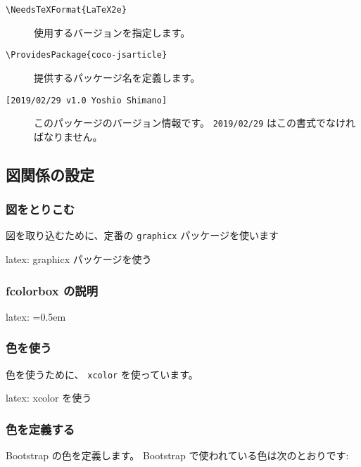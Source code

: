 \documentclass[dvipdfmx,a4j,14pt,uplatex]{jsarticle}
\begin{document}
\begin{description}
\item[{\texttt{\textbackslash{}NeedsTeXFormat\{LaTeX2e\}}}] 使用するバージョンを指定します。
\item[{\texttt{\textbackslash{}ProvidesPackage\{coco-jsarticle\}}}] 提供するパッケージ名を定義します。
\item[{\texttt{[2019/02/29 v1.0 Yoshio Shimano]}}] このパッケージのバージョン情報です。
\texttt{2019/02/29} はこの書式でなければなりません。
\end{description}

\subsection{図関係の設定}
\label{sec:orga93c5e8}
\subsubsection{図をとりこむ}
\label{sec:org1dd340b}
図を取り込むために、定番の \texttt{graphicx} パッケージを使います

\begin{programlist}[label={org2dc6ae6}]{latex}{: graphicx パッケージを使う}\usepackage{graphicx}
\end{programlist}

\subsubsection{fcolorbox の説明}
\label{sec:org692ddfc}
\begin{programlist}[label={nil}]{latex}{: }\fboxsep=0.5em
\fboxrule=0pt
\end{programlist}

\subsubsection{色を使う}
\label{sec:orgf027b93}
色を使うために、 \texttt{xcolor} を使っています。

\begin{programlist}[label={org9310bf0}]{latex}{: xcolor を使う}\usepackage[usenames,divpsnames,svgnames,table,hyperref]{xcolor}
\end{programlist}

\subsubsection{色を定義する}
\label{sec:org2838d54}
Bootstrap の色を定義します。
Bootstrap で使われている色は次のとおりです:
\end{document}
